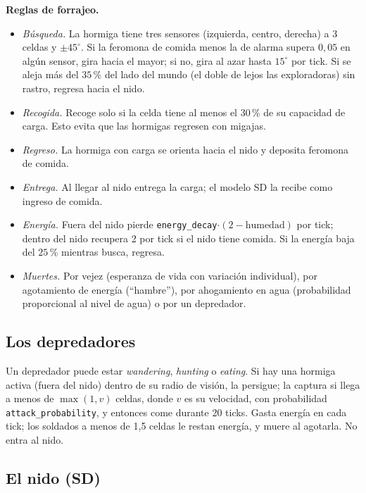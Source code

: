 \documentclass[11pt,a4paper]{article}
\newcommand{\code}[1]{\texttt{\small #1}}
\begin{document}
\textbf{Reglas de forrajeo.}
\begin{itemize}
  \item \textit{Búsqueda.} La hormiga tiene tres sensores (izquierda, centro, derecha) a 3 celdas y $\pm45^\circ$. Si la feromona de comida menos la de alarma supera $0{,}05$ en algún sensor, gira hacia el mayor; si no, gira al azar hasta $15^\circ$ por tick. Si se aleja más del $35\,\%$ del lado del mundo (el doble de lejos las exploradoras) sin rastro, regresa hacia el nido.
  \item \textit{Recogida.} Recoge solo si la celda tiene al menos el $30\,\%$ de su capacidad de carga. Esto evita que las hormigas regresen con migajas.
  \item \textit{Regreso.} La hormiga con carga se orienta hacia el nido y deposita feromona de comida.
  \item \textit{Entrega.} Al llegar al nido entrega la carga; el modelo SD la recibe como ingreso de comida.
  \item \textit{Energía.} Fuera del nido pierde \code{energy\_decay}$\cdot(2-\text{humedad})$ por tick; dentro del nido recupera 2 por tick si el nido tiene comida. Si la energía baja del $25\,\%$ mientras busca, regresa.
  \item \textit{Muertes.} Por vejez (esperanza de vida con variación individual), por agotamiento de energía (``hambre''), por ahogamiento en agua (probabilidad proporcional al nivel de agua) o por un depredador.
\end{itemize}

\subsection{Los depredadores}

Un depredador puede estar \textit{wandering}, \textit{hunting} o \textit{eating}. Si hay una hormiga activa (fuera del nido) dentro de su radio de visión, la persigue; la captura si llega a menos de $\max(1, v)$ celdas, donde $v$ es su velocidad, con probabilidad \code{attack\_probability}, y entonces come durante 20 ticks. Gasta energía en cada tick; los soldados a menos de 1,5 celdas le restan energía, y muere al agotarla. No entra al nido.

\subsection{El nido (SD)}
\end{document}

